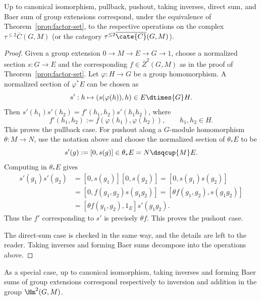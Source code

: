 \begin{proposition}\label{prop:factor-set-operation}
	Up to canonical isomorphism, pullback, pushout, taking inverses, direct
	sum, and Baer sum of group extensions correspond, under the equivalence
	of Theorem~\ref{prop:factor-set}, to the respective operations on the
	complex $\tau^{\leq2}\overline{C}(G,M)$ (or the category
	$\tau^{\leq2}\overline{\cate{C}}(G,M)$).
\end{proposition}
\begin{proof}
	Given a group extension $0\to M\to E\to G\to1$, choose a normalized
	section $s:G\to E$ and the corresponding
	$f\in\overline{Z}^2(G,M)$ as in the proof of
	Theorem~\ref{prop:factor-set}. Let $\varphi:H\to G$ be a group
	homomorphism. A normalized section of $\varphi^*E$ can be chosen as
	\[ s':h\mapsto(s(\varphi(h)),h)\in E\dtimes{G}H. \]
	Then $s'(h_1)s'(h_2)=f'(h_1,h_2)s'(h_1h_2)$, where
	\[ f'(h_1,h_2):=f(\varphi(h_1),\varphi(h_2)),\qquad h_1,h_2\in H. \]
	This proves the pullback case. For pushout along a $G$-module
	homomorphism $\theta:M\to N$, use the notation above and choose the
	normalized section of $\theta_*E$ to be
	\[ s'(g):=[0,s(g)]\in\theta_*E=N\dsqcup{M}E. \]
	Computing in $\theta_*E$ gives
	\begin{align*}
		s'(g_1)s'(g_2)&=[0,s(g_1)][0,s(g_2)]=[0,s(g_1)s(g_2)]\\
		&=[0,f(g_1,g_2)s(g_1g_2)]
		=[\theta f(g_1,g_2),s(g_1g_2)]\\
		&=[\theta f(g_1,g_2),1_E]s'(g_1g_2).
	\end{align*}
	Thus the $f'$ corresponding to $s'$ is precisely $\theta f$. This proves
	the pushout case.

	The direct-sum case is checked in the same way, and the details are left
	to the reader. Taking inverses and forming Baer sums decompose into the
	operations above.
\end{proof}

As a special case, up to canonical isomorphism, taking inverses and forming
Baer sums of group extensions correspond respectively to inversion and
addition in the group $\Hm^2(G,M)$.


